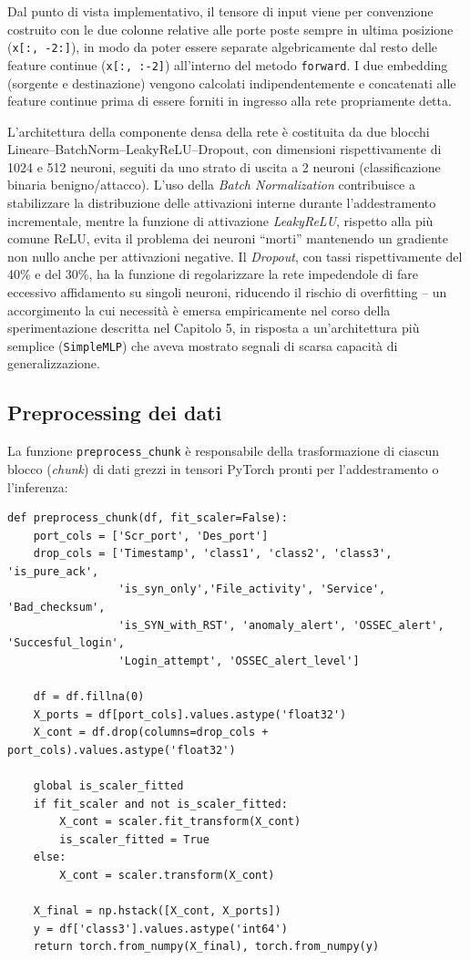 \documentclass[12pt,a4paper]{report}
\begin{document}
Dal punto di vista implementativo, il tensore di input viene per convenzione costruito con le due colonne relative alle porte poste sempre in ultima posizione (\texttt{x[:, -2:]}), in modo da poter essere separate algebricamente dal resto delle feature continue (\texttt{x[:, :-2]}) all'interno del metodo \texttt{forward}. I due embedding (sorgente e destinazione) vengono calcolati indipendentemente e concatenati alle feature continue prima di essere forniti in ingresso alla rete propriamente detta.

L'architettura della componente densa della rete è costituita da due blocchi Lineare--BatchNorm--LeakyReLU--Dropout, con dimensioni rispettivamente di 1024 e 512 neuroni, seguiti da uno strato di uscita a 2 neuroni (classificazione binaria benigno/attacco). L'uso della \emph{Batch Normalization} contribuisce a stabilizzare la distribuzione delle attivazioni interne durante l'addestramento incrementale, mentre la funzione di attivazione \emph{LeakyReLU}, rispetto alla più comune ReLU, evita il problema dei neuroni ``morti'' mantenendo un gradiente non nullo anche per attivazioni negative. Il \emph{Dropout}, con tassi rispettivamente del 40\% e del 30\%, ha la funzione di regolarizzare la rete impedendole di fare eccessivo affidamento su singoli neuroni, riducendo il rischio di overfitting -- un accorgimento la cui necessità è emersa empiricamente nel corso della sperimentazione descritta nel Capitolo 5, in risposta a un'architettura più semplice (\texttt{SimpleMLP}) che aveva mostrato segnali di scarsa capacità di generalizzazione.

\subsection{Preprocessing dei dati}

La funzione \texttt{preprocess\_chunk} è responsabile della trasformazione di ciascun blocco (\emph{chunk}) di dati grezzi in tensori PyTorch pronti per l'addestramento o l'inferenza:

\begin{lstlisting}[caption={Funzione di preprocessing (\texttt{validazioneACDBconEmbedding.py})}]
def preprocess_chunk(df, fit_scaler=False):
    port_cols = ['Scr_port', 'Des_port']
    drop_cols = ['Timestamp', 'class1', 'class2', 'class3', 'is_pure_ack',
                 'is_syn_only','File_activity', 'Service', 'Bad_checksum',
                 'is_SYN_with_RST', 'anomaly_alert', 'OSSEC_alert', 'Succesful_login',
                 'Login_attempt', 'OSSEC_alert_level']

    df = df.fillna(0)
    X_ports = df[port_cols].values.astype('float32')
    X_cont = df.drop(columns=drop_cols + port_cols).values.astype('float32')

    global is_scaler_fitted
    if fit_scaler and not is_scaler_fitted:
        X_cont = scaler.fit_transform(X_cont)
        is_scaler_fitted = True
    else:
        X_cont = scaler.transform(X_cont)

    X_final = np.hstack([X_cont, X_ports])
    y = df['class3'].values.astype('int64')
    return torch.from_numpy(X_final), torch.from_numpy(y)
\end{lstlisting}
\end{document}
